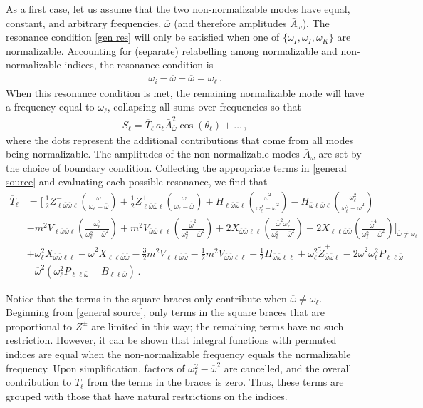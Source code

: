 \documentclass[letterpaper,11pt]{article}
\newcommand{\oi}{\omega_i}
\newcommand{\ol}{\omega_\ell}
\newcommand{\thl}{\theta_\ell}
\newcommand{\ob}{\overline{\omega}}
\begin{document}
As a first case, let us assume that the two non-normalizable modes have equal, constant, and arbitrary frequencies, $\ob$ (and therefore amplitudes $\bar A_{\ob}$). The resonance condition \eqref{gen res} will only be satisfied when one of $\{\omega_I, \omega_I, \omega_K \}$ are normalizable. Accounting for (separate) relabelling among normalizable and non-normalizable indices, the resonance condition is
\begin{align}
\label{gen nn}
\oi - \ob + \ob = \ol \, .
\end{align}
When this resonance condition is met, the remaining normalizable mode will have a frequency equal to $\ol$, collapsing all sums over frequencies so that
\begin{align}
\label{2genNN}
S_\ell = \overline{T}_{\ell} \, a_\ell \bar A_{\ob}^2 \cos (\thl) + \ldots \, ,
\end{align}
where the dots represent the additional contributions that come from all modes being normalizable. The amplitudes of the non-normalizable modes $\bar A_{\ob}$ are set by the choice of boundary condition. Collecting the appropriate terms in \eqref{general source} and evaluating each possible resonance, we find that
\begin{align}
\label{S:2NN}
\overline{T}_{\ell} &=  \bigg[ \, \frac{1}{2} Z^-_{\ell\ob\ob\ell} \left( \frac{\ob}{\ol + \ob} \right) + \frac{1}{2} Z^+_{\ell\ob\ob\ell} \left( \frac{\ob}{\ol - \ob} \right)  + H_{\ell \ob \ob \ell} \left( \frac{\ob^2}{\ol^2 - \ob^2} \right)  - H_{\ob\ell\ob\ell} \left(\frac{\ol^2}{\ol^2 - \ob^2} \right) \nonumber \\
%
& - m^2 V_{\ell \ob\ob\ell}  \left(\frac{\ol^2}{\ol^2 - \ob^2} \right) + m^2 V_{\ob\ob\ell\ell} \left( \frac{\ob^2}{\ol^2 - \ob^2} \right) + 2 X_{\ob\ob\ell\ell} \left( \frac{\ob^2 \ol^2}{\ol^2 - \ob^2} \right) - 2 X_{\ell\ell\ob\ob} \left( \frac{\ob^4}{\ol^2 - \ob^2} \right) \bigg]_{\ob \neq \ol} \nonumber \\
%
&  + \ol^2 X_{\ob\ob\ell\ell}  - \ob^2 X_{\ell\ell\ob\ob} - \frac{3}{2} m^2 V_{\ell\ell\ob\ob} - \frac{1}{2} m^2 V_{\ob\ob\ell\ell}  - \frac{1}{2} H_{\ob\ob\ell\ell} + \ol^2 \tilde{Z}^+_{\ob\ob\ell} - 2 \ob^2 \ol^2 P_{\ell\ell\ob} \nonumber \\
%
& - \ob^2 \left( \ol^2 P_{\ell\ell \ob} - B_{\ell\ell\ob} \right) \, .
\end{align}

Notice that the terms in the square braces only contribute when $\ob \neq \ol$. Beginning from \eqref{general source}, only terms in the square braces that are proportional to $Z^{\pm}$ are limited in this way; the remaining terms have no such restriction. However, it can be shown that integral functions with permuted indices are equal when the non-normalizable frequency equals the normalizable frequency. Upon simplification, factors of $\ol^2 - \ob^2$ are cancelled, and the overall contribution to $T_{\ell}$ from the terms in the braces is zero. Thus, these terms are grouped with those that have natural restrictions on the indices. 
\end{document}

